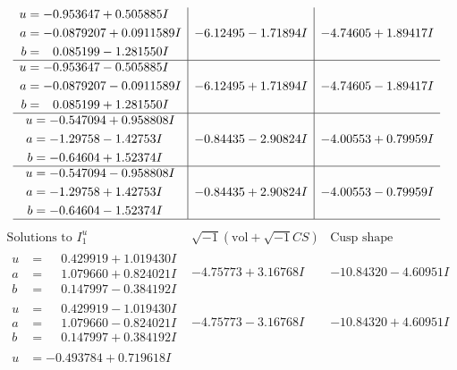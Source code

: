 \documentclass[1p]{elsarticle_modified}
\theoremstyle{definition}
\newcommand{\I}{\sqrt{-1}}
\begin{document}
$$\begin{array}{c|c|c}
\begin{aligned}
u &= -0.953647 + 0.505885 I \\
a &= -0.0879207 + 0.0911589 I \\
b &= \phantom{-}0.085199 - 1.281550 I\end{aligned}
 & -6.12495 - 1.71894 I & -4.74605 + 1.89417 I \\ \hline\begin{aligned}
u &= -0.953647 - 0.505885 I \\
a &= -0.0879207 - 0.0911589 I \\
b &= \phantom{-}0.085199 + 1.281550 I\end{aligned}
 & -6.12495 + 1.71894 I & -4.74605 - 1.89417 I \\ \hline\begin{aligned}
u &= -0.547094 + 0.958808 I \\
a &= -1.29758 - 1.42753 I \\
b &= -0.64604 + 1.52374 I\end{aligned}
 & -0.84435 - 2.90824 I & -4.00553 + 0.79959 I \\ \hline\begin{aligned}
u &= -0.547094 - 0.958808 I \\
a &= -1.29758 + 1.42753 I \\
b &= -0.64604 - 1.52374 I\end{aligned}
 & -0.84435 + 2.90824 I & -4.00553 - 0.79959 I\\
 \hline 
 \end{array}$$\newpage$$\begin{array}{c|c|c}  
\text{Solutions to }I^u_{1}& \I (\text{vol} + \sqrt{-1}CS) & \text{Cusp shape}\\
 \hline 
\begin{aligned}
u &= \phantom{-}0.429919 + 1.019430 I \\
a &= \phantom{-}1.079660 + 0.824021 I \\
b &= \phantom{-}0.147997 - 0.384192 I\end{aligned}
 & -4.75773 + 3.16768 I & -10.84320 - 4.60951 I \\ \hline\begin{aligned}
u &= \phantom{-}0.429919 - 1.019430 I \\
a &= \phantom{-}1.079660 - 0.824021 I \\
b &= \phantom{-}0.147997 + 0.384192 I\end{aligned}
 & -4.75773 - 3.16768 I & -10.84320 + 4.60951 I \\ \hline\begin{aligned}
u &= -0.493784 + 0.719618 I \\

\end{aligned}
\end{array}$$
\end{document}
